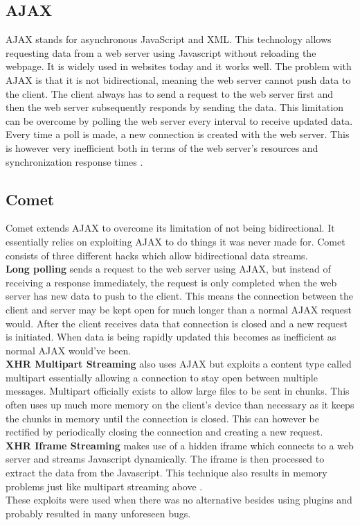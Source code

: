 \documentclass[prodmode,acmtecs]{acmsmall}
\begin{document}
\subsection{AJAX} 
AJAX stands for asynchronous JavaScript and XML. This technology allows requesting data from a web server using Javascript without reloading the webpage. It is widely used in websites today and it works well. The problem with AJAX is that it is not bidirectional, meaning the web server cannot push data to the client. The client always has to send a request to the web server first and then the web server subsequently responds by sending the data. This limitation can be overcome by polling the web server every interval to receive updated data. Every time a poll is made, a new connection is created with the web server. This is however very inefficient both in terms of the web server's resources and synchronization response times \cite{gutwin2011real}. 

\subsection{Comet}
Comet extends AJAX to overcome its limitation of not being bidirectional. It essentially relies on exploiting AJAX to do things it was never made for. Comet consists of three different hacks which allow bidirectional data streams. \\
\textbf{Long polling} sends a request to the web server using AJAX, but instead of receiving a response immediately, the request is only completed when the web server has new data to push to the client. This means the connection between the client and server may be kept open for much longer than a normal AJAX request would. After the client receives data that connection is closed and a new request is initiated. When data is being rapidly updated this becomes as inefficient as normal AJAX would've been.\\
\textbf{XHR Multipart Streaming} also uses AJAX but exploits a content type called multipart essentially allowing a connection to stay open between multiple messages. Multipart officially exists to allow large files to be sent in chunks. This often uses up much more memory on the client's device than necessary as it keeps the chunks in memory until the connection is closed. This can however be rectified by periodically closing the connection and creating a new request.\\
\textbf{XHR Iframe Streaming} makes use of a hidden iframe which connects to a web server and streams Javascript dynamically. The iframe is then processed to extract the data from the Javascript. This technique also results in memory problems just like multipart streaming above \cite{gutwin2011real}.\\
These exploits were used when there was no alternative besides using plugins and probably resulted in many unforeseen bugs.
\end{document}
